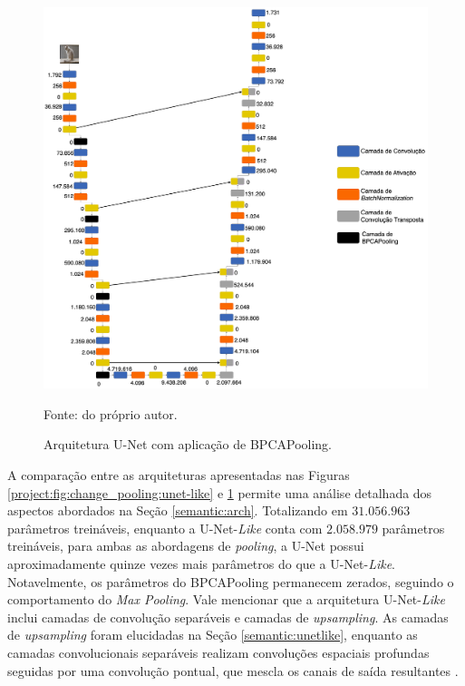 \begin{figure}[H]
    \centering
    \caption{Arquitetura U-Net com aplicação de BPCAPooling.}
    \includegraphics[width=1\textwidth]{recursos/imagens/project/unet-with-bpca.png}
    \label{project:fig:change_pooling:unet}

    Fonte: do próprio autor.
\end{figure}

A comparação entre as arquiteturas apresentadas nas Figuras \ref{project:fig:change_pooling:unet-like} e \ref{project:fig:change_pooling:unet} permite uma análise detalhada dos aspectos abordados na Seção \ref{semantic:arch}. Totalizando em $31.056.963$ parâmetros treináveis, enquanto a U-Net-\textit{Like} conta com $2.058.979$ parâmetros treináveis, para ambas as abordagens de \textit{pooling}, a U-Net possui aproximadamente quinze vezes mais parâmetros do que a U-Net-\textit{Like}. Notavelmente, os parâmetros do BPCAPooling permanecem zerados, seguindo o comportamento do \textit{Max Pooling}. Vale mencionar que a arquitetura U-Net-\textit{Like} inclui camadas de convolução separáveis e camadas de \textit{upsampling}. As camadas de \textit{upsampling} foram elucidadas na Seção \ref{semantic:unetlike}, enquanto as camadas convolucionais separáveis realizam convoluções espaciais profundas seguidas por uma convolução pontual, que mescla os canais de saída resultantes \citep{Zhao2018AutomaticFPGA}.


